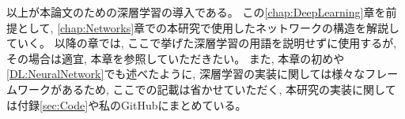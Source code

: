 以上が本論文のための深層学習の導入である。
この\ref{chap:DeepLearning}章を前提として, \ref{chap:Networks}章での本研究で使用したネットワークの構造を解説していく。
以降の章では, ここで挙げた深層学習の用語を説明せずに使用するが, その場合は適宜, 本章を参照していただきたい。
また, 本章の初めや\ref{DL:NeuralNetwork}でも述べたように, 深層学習の実装に関しては様々なフレームワークがあるため, ここでの記載は省かせていただく, 本研究の実装に関しては付録\ref{sec:Code}や私のGitHub\cite{GitHubGotoK}にまとめている。















